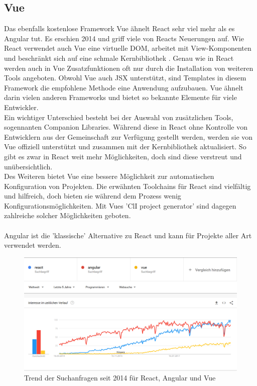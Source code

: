 \subsection{Vue}
Das ebenfalls kostenlose Framework Vue ähnelt React sehr viel mehr als es Angular tut. Es erschien 2014 und griff viele von Reacts Neuerungen auf. Wie React verwendet auch Vue eine virtuelle DOM, arbeitet mit View-Komponenten und beschränkt sich auf eine schmale Kernbibliothek \cite{8}. Genau wie in React werden auch in Vue Zusatzfunktionen oft nur durch die Installation von weiteren Tools angeboten. Obwohl Vue auch JSX unterstützt, sind Templates in diesem Framework die empfohlene Methode eine Anwendung aufzubauen. Vue ähnelt darin vielen anderen Frameworks und bietet so bekannte Elemente für viele Entwickler. \\
Ein wichtiger Unterschied besteht bei der Auswahl von zusätzlichen Tools, sogennanten Companion Libraries. Während diese in React ohne Kontrolle von Entwicklern aus der Gemeinschaft zur Verfügung gestellt werden, werden sie von Vue offiziell unterstützt und zusammen mit der Kernbibliothek aktualisiert. So gibt es zwar in React weit mehr Möglichkeiten, doch sind diese verstreut und unübersichtlich. \cite{8}\\
Des Weiteren bietet Vue eine bessere Möglichkeit zur automatischen Konfiguration von Projekten. Die erwähnten Toolchains für React sind vielfältig und hilfreich, doch bieten sie während dem Prozess wenig Konfigurationsmöglichkeiten. Mit Vues 'ClI project generator' sind dagegen zahlreiche solcher Möglichkeiten geboten. \cite{8} \\\\
Angular ist die 'klassische' Alternative zu React und kann für Projekte aller Art verwendet werden.
\begin{figure}[!thb]
     \centerline{\includegraphics[width=12cm]{../Abbildungen/reactVueAng.png}}
  \caption{Trend der Suchanfragen seit 2014 für React, Angular und Vue \cite{Abb2.8}}
  \label{Trend der Suchanfragen}
\end{figure}
